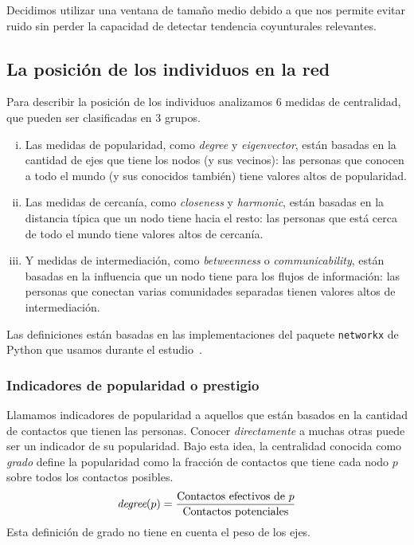 \documentclass[a4paper,11pt]{book}
\theoremstyle{definition}
\begin{document}

Decidimos utilizar una ventana de tama\~no medio debido a que nos permite evitar ruido sin perder la capacidad de detectar tendencia coyunturales relevantes.

\subsection{La posici\'on de los individuos en la red}

Para describir la posici\'on de los individuos analizamos 6 medidas de centralidad, que pueden ser clasificadas en 3 grupos.
%
\begin{enumerate}[i)]
\item Las medidas de popularidad, como \emph{degree} y \emph{eigenvector}, est\'an basadas en la cantidad de ejes que tiene los nodos (y sus vecinos): las personas que conocen a todo el mundo (y sus conocidos tambi\'en) tiene valores altos de popularidad.
%
\item Las medidas de cercan\'ia, como \emph{closeness} y \emph{harmonic}, est\'an basadas en la distancia t\'ipica que un nodo tiene hacia el resto: las personas que est\'a cerca de todo el mundo tiene valores altos de cercan\'ia.
%
\item Y medidas de intermediaci\'on, como \emph{betweenness} o \emph{communicability}, est\'an basadas en la influencia que un nodo tiene para los flujos de informaci\'on: las personas que conectan varias comunidades separadas tienen valores altos de intermediaci\'on.
\end{enumerate}
%
Las definiciones est\'an basadas en las implementaciones del paquete \texttt{networkx} de Python que usamos durante el estudio~\cite{hagberg2020-networkx}.


\subsubsection{Indicadores de popularidad o prestigio}

Llamamos indicadores de popularidad a aquellos que est\'an basados en la cantidad de contactos que tienen las personas.
%
Conocer \emph{directamente} a muchas otras puede ser un indicador de su popularidad.
%
Bajo esta idea, la centralidad conocida como \emph{grado} define la popularidad como la fracci\'on de contactos que tiene cada nodo $p$ sobre todos los contactos posibles.
%
\begin{equation}
\emph{degree}(p) = \frac{\text{Contactos efectivos de $p$}}{\text{Contactos potenciales}}
\end{equation}
%
Esta definici\'on de grado no tiene en cuenta el peso de los ejes.
\end{document}
